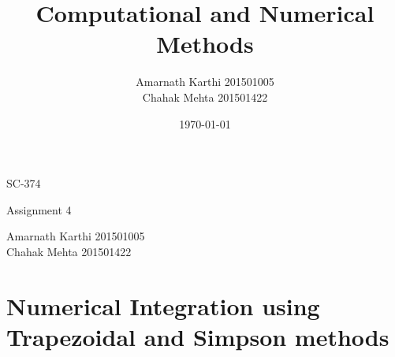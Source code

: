\documentclass[12,a4paper]{article}
\title{Computational and Numerical Methods}
\date{\today}
\author{Amarnath Karthi  201501005 \\ Chahak Mehta  201501422}
\begin{document}
    \begin{titlepage}
	    \centering
	    {\scshape\LARGE SC-374 \par}
	    \vspace{0.1cm}
	    {\huge \@title \par}
	    \vspace{0.5cm}
	    {\Large Assignment 4\par}
	    \vspace{10cm}
	    \Large Amarnath Karthi          201501005\\
	    \Large Chahak Mehta             201501422\\
	    \vspace{5cm}
	    {\large \@date\par}
    \end{titlepage}
    \section{Numerical Integration using Trapezoidal and Simpson methods}
\end{document}
